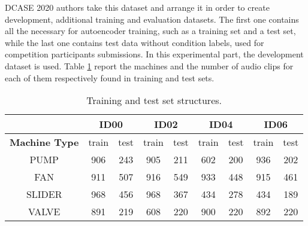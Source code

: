 DCASE 2020 authors take this dataset and arrange it in order to create development, additional training and evaluation datasets. The first one contains all the necessary for autoencoder training, such as a training set and a test set, while the last one contains test data without condition labels, used for competition participants submissions. In this experimental part, the development dataset is used. Table \ref{training-test-sets-structure} report the machines and the number of audio clips for each of them respectively found in training and test sets.
\begin{table}[ht]
\centering
\begin{tabular}{|c|c|c|c|c|c|c|c|c|} 
\cline{2-9}
\multicolumn{1}{c|}{} & \multicolumn{2}{c|}{\textbf{ID00}} & \multicolumn{2}{c|}{\textbf{ID02}} & \multicolumn{2}{c|}{\textbf{ID04}} & \multicolumn{2}{c|}{\textbf{ID06}} \\ 
\hline
\textbf{Machine Type} & train & test & train & test & train & test & train & test \\ 
\hline
PUMP & 906 & 243 & 905 & 211 & 602 & 200 & 936 & 202 \\ 
\hline
FAN & 911 & 507 & 916 & 549 & 933 & 448 & 915 & 461 \\ 
\hline
SLIDER & 968 & 456 & 968 & 367 & 434 & 278 & 434 & 189 \\ 
\hline
VALVE & 891 & 219 & 608 & 220 & 900 & 220 & 892 & 220 \\
\hline
\end{tabular}
\caption{Training and test set structures.}
\label{training-test-sets-structure}
\end{table}
